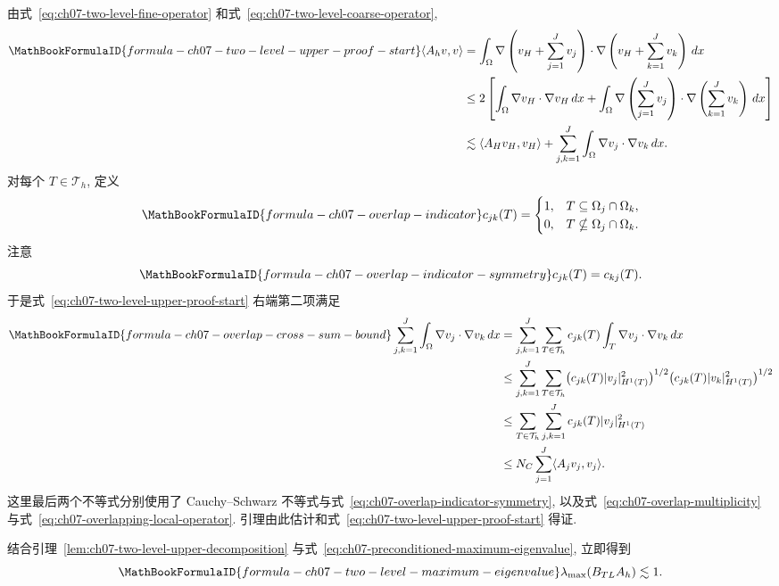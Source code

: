 \begin{Proof}
由式~\eqref{eq:ch07-two-level-fine-operator} 和式~\eqref{eq:ch07-two-level-coarse-operator},
\begin{align}
\MathBookFormulaID{formula-ch07-two-level-upper-proof-start}
\langle A_hv,v\rangle
&=\int_\Omega\nabla\left(v_H+\sum_{j=1}^{J}v_j\right)
\cdot\nabla\left(v_H+\sum_{k=1}^{J}v_k\right)\,dx\notag\\
&\leq2\left[\int_\Omega\nabla v_H\cdot\nabla v_H\,dx
+\int_\Omega\nabla\left(\sum_{j=1}^{J}v_j\right)
\cdot\nabla\left(\sum_{k=1}^{J}v_k\right)\,dx\right]\notag\\
&\lesssim\langle A_Hv_H,v_H\rangle
+\sum_{j,k=1}^{J}\int_\Omega\nabla v_j\cdot\nabla v_k\,dx.
\label{eq:ch07-two-level-upper-proof-start}
\end{align}
对每个 $T\in\mathcal T_h$, 定义
\[
\MathBookFormulaID{formula-ch07-overlap-indicator}
c_{jk}(T)=
\begin{cases}
1,&T\subseteq\Omega_j\cap\Omega_k,\\
0,&T\nsubseteq\Omega_j\cap\Omega_k.
\end{cases}
\]
注意
\begin{equation}
\MathBookFormulaID{formula-ch07-overlap-indicator-symmetry}
\label{eq:ch07-overlap-indicator-symmetry}
c_{jk}(T)=c_{kj}(T).
\end{equation}
于是式~\eqref{eq:ch07-two-level-upper-proof-start} 右端第二项满足
\begin{align*}
\MathBookFormulaID{formula-ch07-overlap-cross-sum-bound}
\sum_{j,k=1}^{J}\int_\Omega\nabla v_j\cdot\nabla v_k\,dx
&=\sum_{j,k=1}^{J}\sum_{T\in\mathcal T_h}c_{jk}(T)
\int_T\nabla v_j\cdot\nabla v_k\,dx\\
&\leq\sum_{j,k=1}^{J}\sum_{T\in\mathcal T_h}
\bigl(c_{jk}(T)|v_j|_{H^1(T)}^2\bigr)^{1/2}
\bigl(c_{jk}(T)|v_k|_{H^1(T)}^2\bigr)^{1/2}\\
&\leq\sum_{T\in\mathcal T_h}\sum_{j,k=1}^{J}c_{jk}(T)|v_j|_{H^1(T)}^2\\
&\leq N_C\sum_{j=1}^{J}\langle A_jv_j,v_j\rangle.
\end{align*}
这里最后两个不等式分别使用了 Cauchy--Schwarz 不等式与式~\eqref{eq:ch07-overlap-indicator-symmetry}, 以及式~\eqref{eq:ch07-overlap-multiplicity} 与式~\eqref{eq:ch07-overlapping-local-operator}.
引理由此估计和式~\eqref{eq:ch07-two-level-upper-proof-start} 得证.
\end{Proof}

结合引理~\ref{lem:ch07-two-level-upper-decomposition} 与式~\eqref{eq:ch07-preconditioned-maximum-eigenvalue}, 立即得到
\begin{equation}
\MathBookFormulaID{formula-ch07-two-level-maximum-eigenvalue}
\label{eq:ch07-two-level-maximum-eigenvalue}
\lambda_{\max}(B_{TL}A_h)\lesssim1.
\end{equation}

